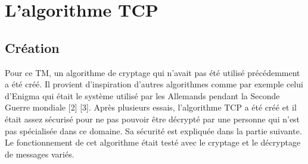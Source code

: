 \documentclass[a4paper,12pt]{report}
\begin{document}
     \section{L'algorithme TCP}
     
     \subsection{Création}
     Pour ce TM, un algorithme de cryptage qui n'avait pas été utilisé précédem\-ment a été créé. Il provient d'inspiration d'autres algorithmes comme par exemple celui d'Enigma qui était le système utilisé par les Allemands pendant la Seconde Guerre mondiale [2] [3]. Après plusieurs essais, l'algorithme TCP a été créé et il était assez sécurisé pour ne pas pouvoir être décrypté par une personne qui n'est pas spécialisée dans ce domaine. Sa sécurité est expliquée dans la partie suivante.\newline
Le fonctionnement de cet algorithme était testé avec le cryptage et le décryp\-tage de messages variés.
\end{document}
